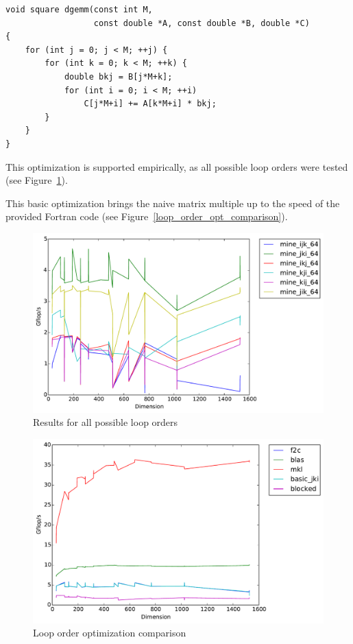 \documentclass[paper=a4, fontsize=11pt]{scrartcl}
\numberwithin{equation}{section}        %
\numberwithin{figure}{section}          %
\numberwithin{table}{section}               %
\begin{document}
\begin{lstlisting}[frame = single, caption={Improved Loop Order Square Matrix Multiply}]
void square dgemm(const int M, 
                  const double *A, const double *B, double *C)
{
    for (int j = 0; j < M; ++j) {
        for (int k = 0; k < M; ++k) {
            double bkj = B[j*M+k];
            for (int i = 0; i < M; ++i)
                C[j*M+i] += A[k*M+i] * bkj;
        }
    }
}
\end{lstlisting}

This optimization is supported empirically, as all possible loop orders were
tested (see Figure~\ref{fig:loop_order}).

This basic optimization brings the naive matrix multiple up to the speed of
the provided Fortran code (see Figure~\ref{loop_order_opt_comparison}).

\begin{figure}
    \centering
    \includegraphics[width=6.0in]{../timings/timings loop order.pdf}
    \caption{Results for all possible loop orders}
    \label{fig:loop_order}
\end{figure}

\begin{figure}
    \centering
    \includegraphics[width=6.0in]{../timings/timing show jki good.pdf}
    \caption{Loop order optimization comparison}
    \label{fig:loop_order_opt_comparison}
\end{figure}
\end{document}
